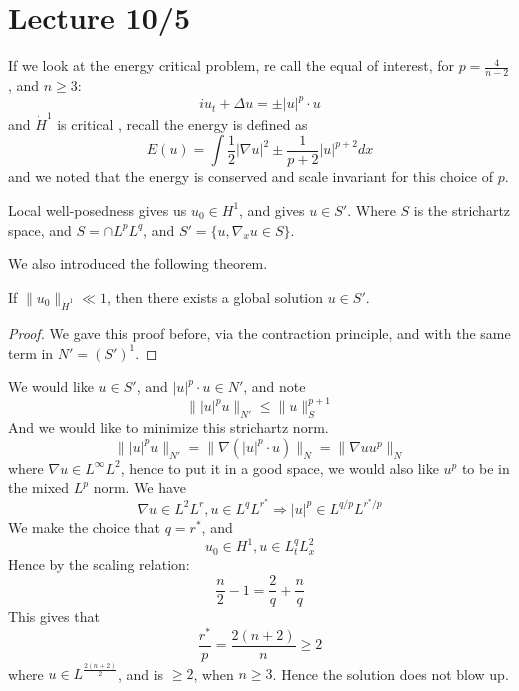 \section{Lecture 10/5}
If we look at the energy critical problem, re call the equal of interest, for $p=\frac{4}{n-2}$, and $n\geq 3$:
\begin{equation*}
    iu_t+\Delta u=\pm|u|^p\cdot u
\end{equation*}
and $\dot{H}^1$ is critical , recall the energy is defined as 
\begin{equation*}
    E(u)=\int\frac{1}{2}|\nabla u|^2\pm \frac{1}{p+2}|u|^{p+2}dx
\end{equation*}
and we noted that the energy is conserved and scale invariant for this choice of $p$.

Local well-posedness gives us $u_0\in H^1$, and gives $u\in S'$. Where $S$ is the strichartz space, and $S=\cap L^pL^q$, and $S'=\{u, \nabla_x u\in S\}$. 

We also introduced the following theorem.
\begin{theorem}
    If $\|u_0\|_{\dot{H}^1}\ll 1$, then there exists a global solution $u\in S'$. 
\end{theorem}
\begin{proof}
    We gave this proof before, via the contraction principle, and with the same  term in $N'=(S')^1$.
\end{proof}
We would like $u\in S'$, and $|u|^p\cdot u\in N'$, and note
\begin{equation*}
    \||u|^p u\|_{N'}\leq\|u\|_S^{p+1}
\end{equation*}
And we would like to minimize this strichartz norm.
\begin{equation*}
    \||u|^pu\|_{N'}=\|\nabla (|u|^p\cdot u)\|_N=\|\nabla u u^p\|_N
\end{equation*}
where $\nabla u\in L^\infty L^2$, hence to put it in a good space, we would also like $u^p$ to be in the mixed $L^p$ norm.
We have
\begin{equation*}
    \nabla u \in L^2L^r, u\in L^qL^{r^*}\Rightarrow |u|^p\in L^{q/p}L^{r^*/p}
\end{equation*}
We make the choice that $q=r^*$, and 
\begin{equation*}
    u_0\in H^1, u\in L_t^q L_x^2
\end{equation*}
Hence by the scaling relation:
\begin{equation*}
    \frac{n}{2}-1=\frac{2}{q}+\frac{n}{q}
\end{equation*}
This gives that 
\begin{equation*}
    \frac{r^*}{p}=\frac{2(n+2)}{n}\geq 2
\end{equation*}
where $u\in L^\frac{2(n+2)}{2}$, and is $\geq 2$, when $n\geq 3$. Hence the solution does not blow up.


